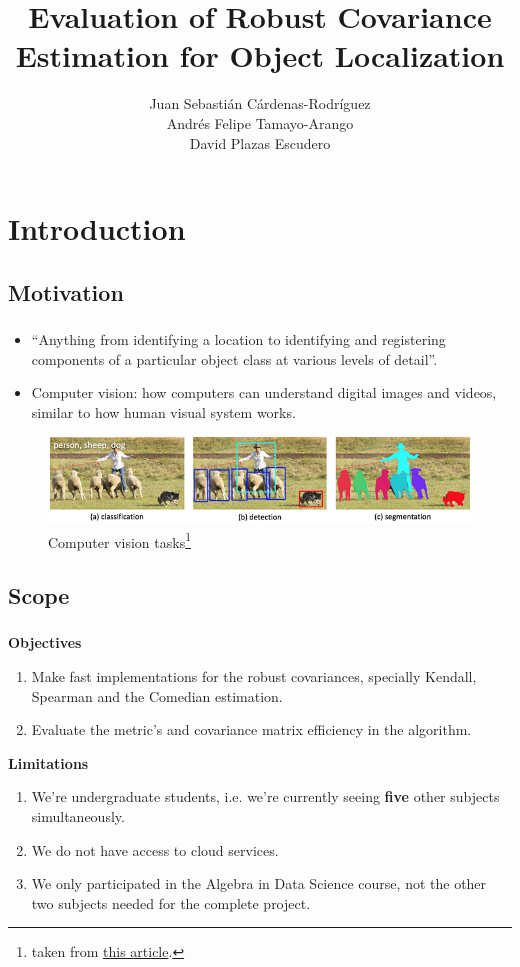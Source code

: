 \documentclass{beamer}
\title{Evaluation of Robust Covariance Estimation for Object Localization}
\author{Juan Sebasti\'an C\'ardenas-Rodríguez \\
  Andr\'es Felipe Tamayo-Arango \\
  David Plazas Escudero \\
  \scalebox{0.7}{Mathematical Engineering, Universidad EAFIT}}
\theoremstyle{definition}
\theoremstyle{remark}
\theoremstyle{example}
\newif\ifinsection
\newif\ifinsubsection
\let\oldsection\section
\renewcommand{\section}{
  \global\insectiontrue
  \global\insubsectionfalse
  \oldsection}
\let\oldsubsection\subsection
\renewcommand{\subsection}{
  \global\insubsectiontrue
  \oldsubsection}
\newcommand {\aframe}[1] {
  \begin{frame}
    \ifinsection\frametitle{\secname}\fi
    \ifinsubsection\framesubtitle{\subsecname}\fi
  #1
  \end{frame}
}
\begin{document}
\begin{frame}[plain]
  \titlepage
\end{frame}

\section{Introduction}
\subsection{Motivation}
\aframe{
  \begin{itemize}
    \item ``Anything from identifying a location to identifying and registering
          components of a particular object class at various levels of
          detail''\parencite{amit20022d}.
    \item Computer vision: how computers can understand digital images and
          videos, similar to how human visual system
          works\parencite{ballard1982computer,huang1996computer,
          amit20022d,szeliski2010computer}.
  \end{itemize}
  \begin{figure}[H]
    \centering \includegraphics[width=\linewidth]{figs/objs.jpg}
    \caption{Computer vision tasks\footnote{taken from
        \href{https://bit.ly/2JTXLid}{this article}.}}
    \label{fig:tasks}
  \end{figure}
}

\subsection{Scope}
\aframe{ \textbf{Objectives}
  \begin{enumerate}
    \item Make fast implementations for the robust covariances, specially
          Kendall, Spearman and the Comedian estimation. \pause
    \item Evaluate the metric's and covariance matrix efficiency in the
          algorithm.
  \end{enumerate} \pause \vspace{0.5cm}

  \textbf{Limitations}
  \begin{enumerate}
    \item We're undergraduate students, i.e. we're currently seeing
          \textbf{five} other subjects simultaneously. \pause
    \item We do not have access to cloud services. \pause
    \item We only participated in the Algebra in Data Science course, not the
          other two subjects needed for the complete project.
  \end{enumerate}
}
\end{document}
